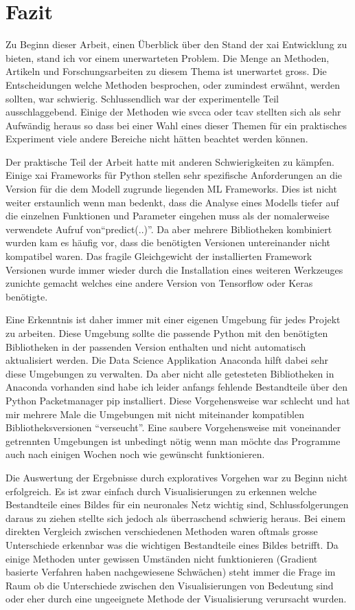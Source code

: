 \documentclass[
  12pt, %
  a4paper, %
  oneside, %
  openany, 
  numbers=noenddot, %
  BCOR=5mm, %
  parskip=half*, %
  thesis, %
]{bfhbook}
\begin{document}
\chapter{Fazit}
Zu Beginn dieser Arbeit, einen Überblick über den Stand der \Gls{xai} Entwicklung zu bieten, stand ich vor einem unerwarteten Problem. Die Menge an Methoden, Artikeln und Forschungsarbeiten zu diesem Thema ist unerwartet gross. Die Entscheidungen welche Methoden besprochen, oder zumindest erwähnt, werden sollten, war schwierig. Schlussendlich war der experimentelle Teil ausschlaggebend. Einige der Methoden wie \acrshort{svcca} oder \acrshort{tcav} stellten sich als sehr Aufwändig heraus so dass bei einer Wahl eines dieser Themen für ein praktisches Experiment viele andere Bereiche nicht hätten beachtet werden können.

Der praktische Teil der Arbeit hatte mit anderen Schwierigkeiten zu kämpfen. Einige \Gls{xai} Frameworks für Python stellen sehr spezifische Anforderungen an die Version für die dem Modell zugrunde liegenden \Gls{ML} Frameworks. Dies ist nicht weiter erstaunlich wenn man bedenkt, dass die Analyse eines Modells tiefer auf die einzelnen Funktionen und Parameter eingehen muss als der nomalerweise verwendete Aufruf  von``predict(..)''. Da aber mehrere Bibliotheken kombiniert wurden kam es häufig vor, dass die benötigten Versionen untereinander nicht kompatibel waren. Das fragile Gleichgewicht der installierten Framework Versionen wurde immer wieder durch die Installation eines weiteren Werkzeuges zunichte gemacht welches eine andere Version von Tensorflow oder Keras benötigte. 

Eine Erkenntnis ist daher immer mit einer eigenen Umgebung für jedes Projekt zu arbeiten. Diese Umgebung sollte die passende Python mit den benötigten Bibliotheken in der passenden Version enthalten und nicht automatisch aktualisiert werden. Die Data Science Applikation Anaconda hilft dabei sehr diese Umgebungen zu verwalten. Da aber nicht alle getesteten Bibliotheken in Anaconda vorhanden sind habe ich leider anfangs fehlende Bestandteile über den Python Packetmanager pip installiert. Diese Vorgehensweise war schlecht und hat mir mehrere Male die Umgebungen mit nicht miteinander kompatiblen Bibliotheksversionen ``verseucht''. Eine saubere Vorgehensweise mit voneinander getrennten Umgebungen ist unbedingt nötig wenn man möchte das Programme auch nach einigen Wochen noch wie gewünscht funktionieren.

Die Auswertung der Ergebnisse durch exploratives Vorgehen war zu Beginn nicht erfolgreich. Es ist zwar einfach durch Visualisierungen zu erkennen welche Bestandteile eines Bildes für ein neuronales Netz wichtig sind, Schlussfolgerungen daraus zu ziehen stellte sich jedoch als überraschend schwierig heraus. Bei einem direkten Vergleich zwischen verschiedenen Methoden waren oftmals grosse Unterschiede erkennbar was die wichtigen Bestandteile eines Bildes betrifft. Da einige Methoden unter gewissen Umständen nicht funktionieren (Gradient basierte Verfahren haben nachgewiesene Schwächen) steht immer die Frage im Raum ob die Unterschiede zwischen den Visualisierungen von Bedeutung sind oder eher durch eine ungeeignete Methode der Visualisierung verursacht wurden. 
\end{document}
